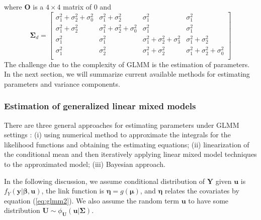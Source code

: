 where $\bm O$ is a $4\times 4$ matrix of 0 and 
\[
\bm \Sigma_d = \left[
\begin{array}{cccc}
\sigma^2_1+ \sigma^2_2 + \sigma^2_0  & \sigma^2_1+\sigma^2_2 & \sigma^2_1 &\sigma^2_1\\
\sigma^2_1+\sigma^2_2 & \sigma^2_1 +\sigma^2_2 +\sigma^2_0 &\sigma^2_1 &\sigma^2_1\\
\sigma^2_1 & \sigma^2_1& \sigma^2_1+\sigma^2_2+\sigma^2_3 & \sigma^2_1 + \sigma^2_2\\
\sigma^2_1 &\sigma^2_2 &\sigma^2_1 +\sigma^2_2 & \sigma^2_1 +\sigma^2_2 +\sigma^2_0\\
\end{array}
\right]
\]
The challenge due to the complexity of GLMM is the estimation of parameters. In the next section,
we will summarize current available methods for estimating parameters and variance components.

\subsubsection{Estimation of generalized linear mixed models}\label{subsub:estimation}	
There are three general approaches for estimating parameters under GLMM settings \citep[Chapter
7]{myers2012generalized}: (i) using numerical method to approximate the integrals for the likelihood
functions and obtaining the estimating equations; (ii) linearization of the conditional mean and
then iteratively applying linear mixed model techniques to the approximated model; (iii) Bayesian
approach.  

In the following discussion, we assume conditional distribution of $\bm Y$ given $\bm u$ is
$f_{Y}(\bm y|\bm \beta, \bm u)$, the link function is $\bm \eta = g(\bm \mu)$, and $\bm \eta$
relates the covariates by equation (\ref{eq:glmm2}). We also assume the random term $\bm u$ to have
some distribution $\bm U \sim \phi_{\bm U}(\bm u|\bm \Sigma)$. 	

